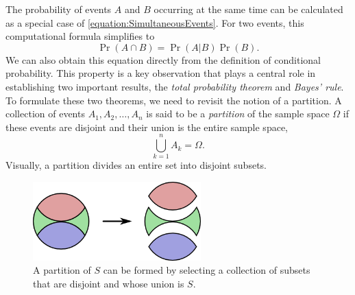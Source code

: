 The probability of events $A$ and $B$ occurring at the same time can be calculated as a special case of \eqref{equation:SimultaneousEvents}.
For two events, this computational formula simplifies to
\begin{equation} \label{equation:ProbabilityIntersection}
\Pr (A \cap B) = \Pr (A|B) \Pr (B) .
\end{equation}
We can also obtain this equation directly from the definition of conditional probability.
This property is a key observation that plays a central role in establishing two important results, the \emph{total probability theorem} and \emph{Bayes' rule}.
To formulate these two theorems, we need to revisit the notion of a partition.
A collection of events $A_1, A_2, \ldots, A_n$ is said to be a \emph{partition} of the sample space $\Omega$ if these events are disjoint and their union is the entire sample space, 
\begin{equation*}
\bigcup_{k=1}^n A_k = \Omega .
\end{equation*}
Visually, a partition divides an entire set into disjoint subsets.

\begin{figure}[htb!]
\begin{center}
\includegraphics[height=3.034cm]{Figures/3Chapter/setpartition2}
\caption{A partition of $S$ can be formed by selecting a collection of subsets that are disjoint and whose union is $S$.}
\label{figure:SetPartitiion2}
\end{center}
\end{figure}

